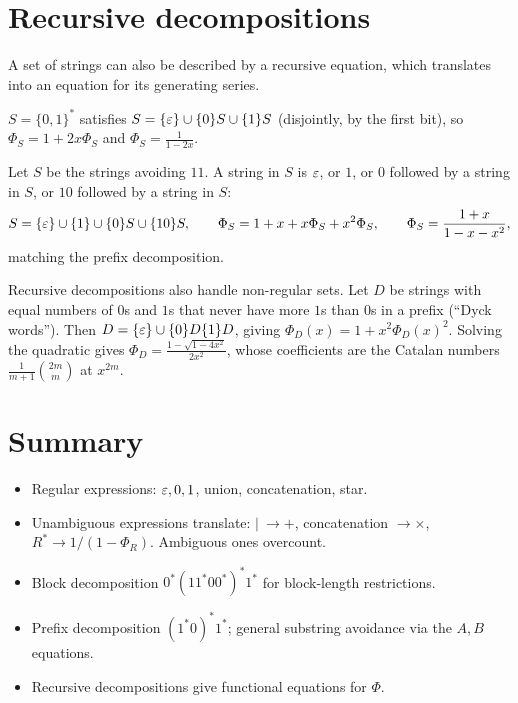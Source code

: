 \section{Recursive decompositions}

A set of strings can also be described by a recursive equation, which translates into an
equation for its generating series.

\begin{example}
$S = \{0,1\}^*$ satisfies $S = \{\varepsilon\} \cup \{0\}S \cup \{1\}S$ (disjointly, by the first bit),
so $\Phi_S = 1 + 2x\Phi_S$ and $\Phi_S = \frac{1}{1-2x}$.
\end{example}

\begin{example}
Let $S$ be the strings avoiding $11$. A string in $S$ is $\varepsilon$, or $1$, or $0$ followed by a
string in $S$, or $10$ followed by a string in $S$:
\[
S = \{\varepsilon\}\cup\{1\}\cup\{0\}S\cup\{10\}S,\qquad
\Phi_S = 1 + x + x\Phi_S + x^2\Phi_S,\qquad \Phi_S = \frac{1+x}{1 - x - x^2},
\]
matching the prefix decomposition.
\end{example}

\begin{example}
Recursive decompositions also handle non-regular sets. Let $D$ be strings with equal numbers of
$0$s and $1$s that never have more $1$s than $0$s in a prefix (``Dyck words''). Then
$D = \{\varepsilon\}\cup\{0\}D\{1\}D$, giving $\Phi_D(x) = 1 + x^2\Phi_D(x)^2$. Solving the quadratic
gives $\Phi_D = \frac{1 - \sqrt{1-4x^2}}{2x^2}$, whose coefficients are the Catalan numbers
$\frac{1}{m+1}\binom{2m}{m}$ at $x^{2m}$.
\end{example}

\section{Summary}
\begin{itemize}
  \item Regular expressions: $\varepsilon,0,1$, union, concatenation, star.
  \item Unambiguous expressions translate: $\mid\ \to +$, concatenation $\to \times$,
        $R^* \to 1/(1-\Phi_R)$. Ambiguous ones overcount.
  \item Block decomposition $0^*(11^*00^*)^*1^*$ for block-length restrictions.
  \item Prefix decomposition $(1^*0)^*1^*$; general substring avoidance via the $A,B$ equations.
  \item Recursive decompositions give functional equations for $\Phi$.
\end{itemize}
